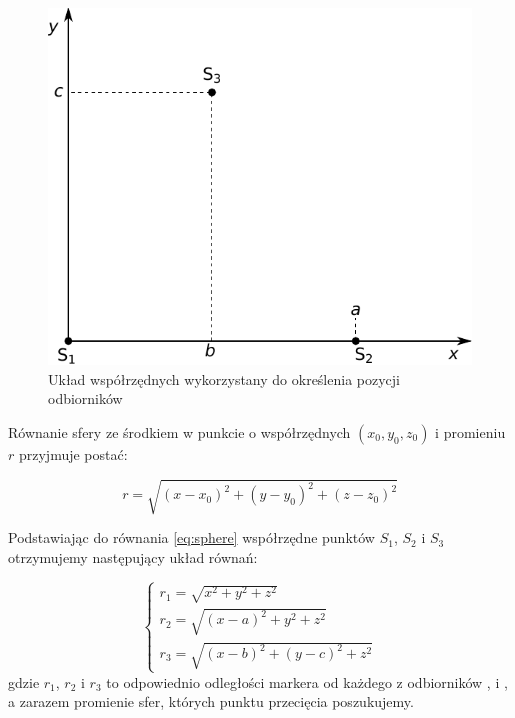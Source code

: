 \begin{figure}
  \includegraphics[width=\textwidth]{gfx/diagramy/schemat_uklad_wspolrzednych_clipped}
  \caption{Układ współrzędnych wykorzystany do określenia pozycji odbiorników}
  \label{fig:schema_coordinates}
\end{figure}

Równanie sfery ze środkiem w punkcie o współrzędnych $(x_0, y_0, z_0)$ i promieniu $r$ przyjmuje postać:

\begin{equation}
 r = \sqrt{(x - x_0)^2 + (y - y_0)^2 + (z - z_0)^2}
 \label{eq:sphere}
\end{equation}

Podstawiając do równania \ref{eq:sphere} współrzędne punktów $S_1$, $S_2$ i $S_3$ otrzymujemy następujący układ równań:

\begin{equation}
 \begin{cases}
  r_1 = \sqrt{x^2 + y^2 + z^2} \\
  r_2 = \sqrt{(x - a)^2 + y^2 + z^2} \\
  r_3 = \sqrt{(x - b)^2 + (y - c)^2 + z^2}
 \end{cases}
 \label{eq:sphere_system_1}
\end{equation}
gdzie $r_1$, $r_2$ i $r_3$ to odpowiednio odległości markera od każdego z odbiorników ,  i , a zarazem promienie sfer, których punktu przecięcia poszukujemy.

